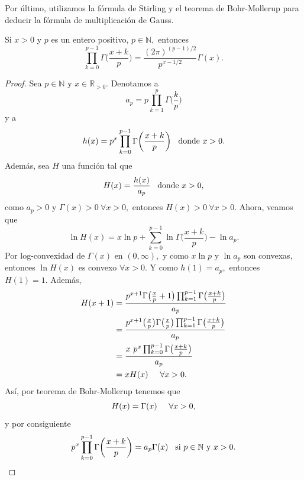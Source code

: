 Por último, utilizamos la fórmula de Stirling y el teorema de Bohr-Mollerup para deducir la fórmula de multiplicación de Gauss.
\begin{theorem}
	Si $x > 0$ y $p$ es un entero positivo, $p \in \mathbb{N},$ entonces $$\prod_{k = 0}^{p-1}\Gamma\bigg(\frac{x+k}{p}\bigg) = \frac{(2\pi)^{(p-1)/2}}{p^{x-1/2}}\Gamma(x).$$
\end{theorem}
\begin{proof}
	Sea $p \in \mathbb{N}$ y $x \in \mathbb{R}_{> 0}.$ Denotamos a $$a_p = p\prod_{k = 1}^{p}\Gamma\bigg(\frac{k}{p}\bigg)$$ y a $$h(x) = p^x\prod_{k = 0}^{p-1}\Gamma\bigg(\frac{x+k}{p}\bigg)\hspace{0.3cm}\textrm{donde }x > 0.$$ Además, sea $H$ una función tal que $$H(x) = \frac{h(x)}{a_p}\hspace{0.3cm}\textrm{donde }x > 0,$$ como $a_p > 0$ y $\Gamma(x) > 0\ \forall x > 0,$ entonces $H(x) > 0\ \forall x > 0.$
	Ahora, veamos que $$\ln H(x) = x\ln p+\sum_{k = 0}^{p-1}\ln \Gamma\bigg(\frac{x+k}{p}\bigg)-\ln a_p.$$ Por log-convexidad de $\Gamma(x)$ en $(0,\infty),$ y como $x \ln p$ y $\ln a_p$ son convexas, entonces $\ln H(x)$ es convexo $\forall x > 0.$
	Y como $h(1) = a_p,$ entonces $H(1) = 1.$ Además, 
	\begin{align*}
		H(x+1) &= \frac{p^{x+1}\Gamma\big(\frac{x}{p}+1\big)\prod_{k = 1}^{p-1}\Gamma\big(\frac{x+k}{p}\big)}{a_p}\\
		&= \frac{p^{x+1}\big(\frac{x}{p}\big)\Gamma\big(\frac{x}{p}\big)\prod_{k = 1}^{p-1}\Gamma\big(\frac{x+k}{p}\big)}{a_p}\\
		&= \frac{x\ p^x\prod_{k = 0}^{p-1}\Gamma\big(\frac{x+k}{p}\big)}{a_p}\\
		&= xH(x)\hspace{0.5cm}\forall x > 0.
	\end{align*}
	Así, por teorema de Bohr-Mollerup tenemos que $$H(x) = \Gamma(x)\hspace{0.5cm}\forall x > 0,$$
	y por consiguiente $$p^x\prod_{k = 0}^{p-1}\Gamma\bigg(\frac{x+k}{p}\bigg) = a_p\Gamma(x)\hspace{0.3cm}\textrm{si }p \in \mathbb{N}\ \textrm{y }x > 0.$$
	

\end{proof}
